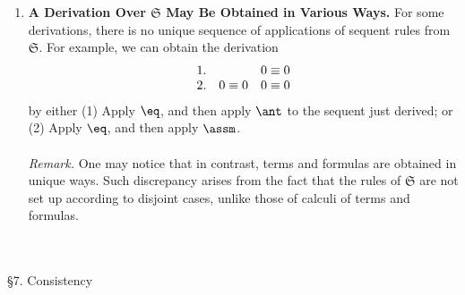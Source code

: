\begin{enumerate}[1.]
%
\item \textbf{A Derivation Over $\mathfrak{S}$ May Be Obtained in Various Ways.} For some derivations, there is no unique sequence of applications of sequent rules from $\mathfrak{S}$. For example, we can obtain the derivation
\[
\begin{array}{lll}
1. & \ & 0 \equiv 0 \cr
2. & 0 \equiv 0 & 0 \equiv 0
\end{array}
\]
by either (1) Apply $\eq$, and then apply $\ant$ to the sequent just derived; or (2) Apply $\eq$, and then apply $\assm$.\\
\ \\
\textit{Remark.} One may notice that in contrast, terms and formulas are obtained in unique ways. Such discrepancy arises from the fact that the rules of $\mathfrak{S}$ are not set up according to disjoint cases, unlike those of calculi of terms and formulas.
\end{enumerate}
\ 
\\
\\
\newpage\noindent
{\large \S7. Consistency}
